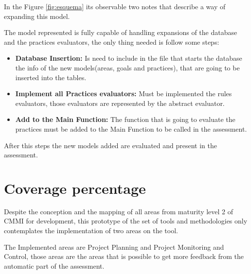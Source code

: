 In the Figure \ref{fig:esquema} its observable two notes that describe a way of expanding this model.

The model represented is fully capable of handling expansions of the database and the practices evaluators, the only thing needed is follow some steps:
\begin{itemize}
	\item \textbf{Database Insertion: } Is need to include in the file that starts the database the info of the new models(areas, goals and practices), that are going to be inserted into the tables.
	\item \textbf{Implement all Practices evaluators: } Must be implemented the rules evaluators, those evaluators are represented by the abstract evaluator.
	\item \textbf{Add to the Main Function: } The function that is going to evaluate the practices must be added to the Main Function to be called in the assessment.
\end{itemize}

After this steps the new models added are evaluated and present in the assessment.

\section{Coverage percentage} \label{sec:coverage}



Despite the conception and the mapping of all areas from maturity level 2 of CMMI for development, this prototype of the set of tools and methodologies only contemplates the implementation of two areas on the tool.

The Implemented areas are Project Planning and Project Monitoring and Control, those areas are the areas that is possible to get more feedback from the automatic part of the assessment. 